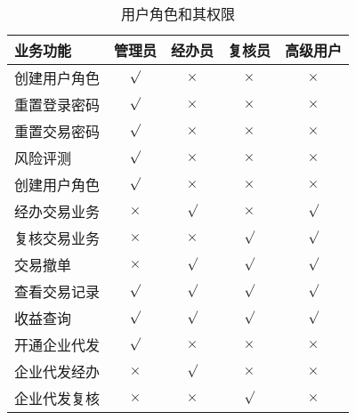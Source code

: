 \begin{table}[htbp]
\begin{tabular*}{\textwidth}{@{\extracolsep{\fill}}lcccc}
	\toprule  %
	业务功能                &管理员          &经办员              &复核员            &高级用户          \\
	\midrule  %
	创建用户角色            &$\surd$        &$\times$            &$\times$           &$\times$       \\
	重置登录密码            &$\surd$        &$\times$            &$\times$           &$\times$       \\
	重置交易密码            &$\surd$        &$\times$            &$\times$           &$\times$       \\
	风险评测               &$\surd$        &$\times$            &$\times$           &$\times$       \\
	创建用户角色            &$\surd$        &$\times$            &$\times$           &$\times$       \\
	经办交易业务            &$\times$       &$\surd$             &$\times$           &$\surd$        \\
	复核交易业务            &$\times$       &$\times$            &$\surd$            &$\surd$        \\
	交易撤单               &$\times$       &$\surd$             &$\surd$            &$\surd$        \\
	查看交易记录            &$\surd$       &$\surd$             &$\surd$            &$\surd$         \\
	收益查询               &$\surd$        &$\surd$             &$\surd$            &$\surd$         \\
	开通企业代发            &$\surd$        &$\times$            &$\times$           &$\times$        \\
	企业代发经办            &$\times$       &$\surd$             &$\times$           &$\times$        \\
	企业代发复核            &$\times$       &$\times$            &$\surd$            &$\times$        \\
	\bottomrule %
\end{tabular*}
\caption{用户角色和其权限}
\label{tab:role}
\end{table}